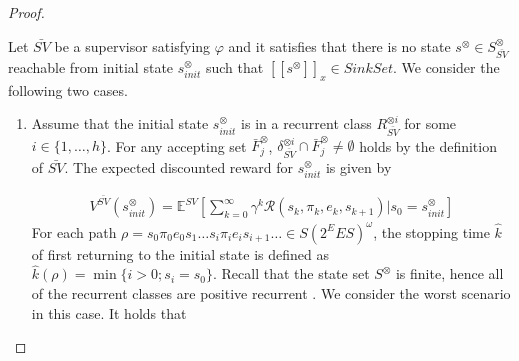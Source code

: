 \documentclass[10pt]{article}
\theoremstyle{definition}
\newcommand{\myspq}{\ensuremath{[\![s^{\otimes}]\!]}_x}
\begin{document}
\begin{proof}
\begin{enumerate}
\end{enumerate}
  Let $\bar{SV}$ be a supervisor satisfying $\varphi$ and it satisfies that there is no state $s^{\otimes} \in S^{\otimes}_{\bar{SV}}$ reachable from initial state $s^{\otimes}_{init}$ such that $\myspq \in SinkSet$. We consider the following two cases.

  \begin{enumerate}
    \vspace{2mm}
    \item Assume that the initial state $s^{\otimes}_{init}$ is in a recurrent class $R^{\otimes i}_{\bar{SV}}$ for some $ i \in \{ 1,\ldots,h \} $.
    For any accepting set $\bar{F}^{\otimes}_j$, $\delta^{\otimes i}_{\bar{SV}} \cap \bar{F}^{\otimes}_j \neq \emptyset$ holds by the definition of $\bar{SV}$. The expected discounted reward for $s^{\otimes}_{init}$ is given by

  \begin{align}
    V^{\bar{SV}}(s^{\otimes}_{init}) = \mathbb{E}^{SV}[ {\sum_{k=0}^{\infty}} \gamma^k \mathcal{R}(s_k, \pi_k, e_k, s_{k+1}) | s_0 = s^{\otimes}_{init} ]
  \end{align}
    For each path $\rho = s_0 \pi_0 e_0 s_1 \ldots s_i \pi_i e_i s_{i+1} \ldots \in S (2^E E S)^{\omega}$, the stopping time $\hat{k}$ of first returning to the initial state is defined as $\hat{k}(\rho) = \min \{ i > 0 ; s_i = s_0 \}$. Recall that the state set $S^{\otimes}$ is finite, hence all of the recurrent classes are positive recurrent \cite{ISP}. We consider the worst scenario in this case. It holds that


\end{enumerate}
\end{proof}
\end{document}
